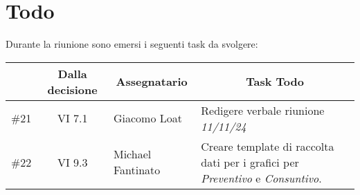 

\section{Todo}

Durante la riunione sono emersi i seguenti task da svolgere:

\vspace{0.5cm}

\begin{table}[htbp]
\centering
{}
\begin{tabular}{|c|c|p{}|p{}|}
    \hline
    \rowcolor[gray]{0.75}
    \multicolumn{1}{|c|}{\textbf{Codice}} & \multicolumn{1}{|c|}{\textbf{Dalla decisione}} & \multicolumn{1}{|c|}{\textbf{Assegnatario}} & \multicolumn{1}{|c|}{\textbf{Task Todo}} \\
    \hline
    \#21 & VI 7.1 & Giacomo Loat & Redigere verbale riunione \emph{11/11/24} \\
    \hline
    \#22 & VI 9.3 & Michael Fantinato & Creare template di raccolta dati per i grafici per \emph{Preventivo} e \emph{Consuntivo}. \\
    \hline
\end{tabular}
\end{table}
